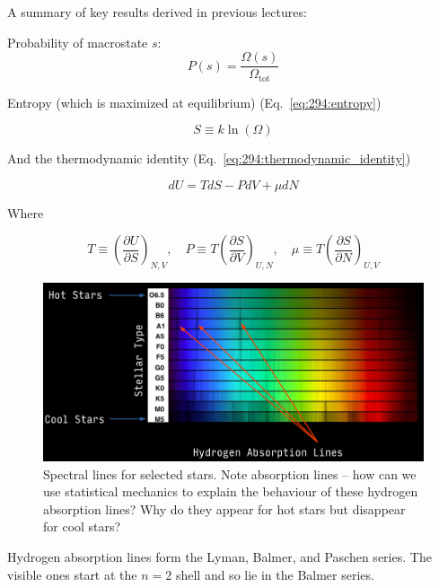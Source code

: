 \documentclass[10pt]{article}
\begin{document}
\begin{blockquote}
	A summary of key results derived in previous lectures:

	Probability of macrostate $ s $:
	\begin{equation}
		P(s) = \frac{\Omega(s)}{ \Omega_{\text{tot}}  }
	\end{equation}

	Entropy (which is maximized at equilibrium) (Eq.~\ref{eq:294:entropy})

	\begin{equation}
		S \equiv k \ln (\Omega)
	\end{equation}

	And the thermodynamic identity (Eq.~\ref{eq:294:thermodynamic_identity})

	\begin{equation}
		dU = TdS - PdV + \mu dN
	\end{equation}

	Where 

	\begin{equation}
		T \equiv (\frac{\partial U}{\partial S} )_{N, V}, \quad
		P \equiv T(\frac{\partial S}{\partial V} )_{U, N}, \quad
		\mu \equiv T(\frac{\partial S}{\partial N} )_{U, V}
	\end{equation}

\end{blockquote}


\begin{figure}[H]
	\centering
	\includegraphics[width=0.8\linewidth]{img/294_spectral_line_stars.png}
	\caption{Spectral lines for selected stars. Note absorption lines -- how can we use statistical mechanics to explain the behaviour of these hydrogen absorption lines? Why do they appear for hot stars but disappear for cool stars?}
	\label{fig:294:hydrogen_absorption_lines}
\end{figure}


Hydrogen absorption lines form the Lyman, Balmer, and Paschen series.
The visible ones start at the $ n=2 $ shell and so lie in the Balmer series.
\end{document}
